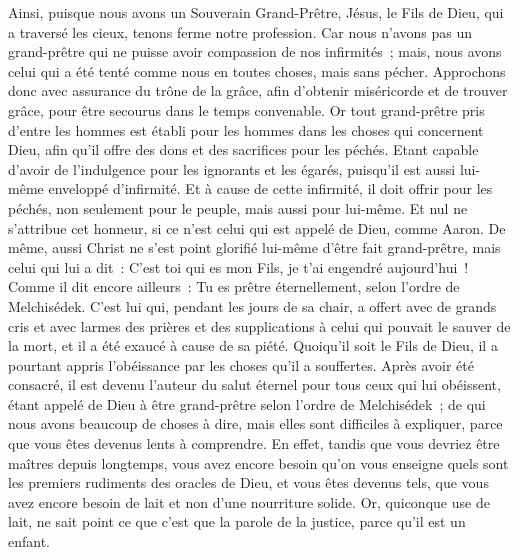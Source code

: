 \begin{multicols}{2}
Ainsi, puisque nous avons un Souverain Grand-Prêtre, Jésus, le Fils de Dieu, qui a traversé les cieux, tenons ferme notre profession.
Car nous n'avons pas un grand-prêtre qui ne puisse avoir compassion de nos infirmités~; mais, nous avons celui qui a été tenté comme nous en toutes choses, mais sans pécher.
Approchons donc avec assurance du trône de la grâce, afin d'obtenir miséricorde et de trouver grâce, pour être secourus dans le temps convenable.
\VerseOne{}Or tout grand-prêtre pris d'entre les hommes est établi pour les hommes dans les choses qui concernent Dieu, afin qu'il offre des dons et des sacrifices pour les péchés.
Etant capable d'avoir de l'indulgence pour les ignorants et les égarés, puisqu'il est aussi lui-même enveloppé d'infirmité.
Et à cause de cette infirmité, il doit offrir pour les péchés, non seulement pour le peuple, mais aussi pour lui-même.
Et nul ne s'attribue cet honneur, si ce n'est celui qui est appelé de Dieu, comme Aaron.
De même, aussi Christ ne s'est point glorifié lui-même d'être fait grand-prêtre, mais celui qui lui a dit~: C'est toi qui es mon Fils, je t'ai engendré aujourd'hui~!
Comme il dit encore ailleurs~: Tu es prêtre éternellement, selon l'ordre de Melchisédek.
C'est lui qui, pendant les jours de sa chair, a offert avec de grands cris et avec larmes des prières et des supplications à celui qui pouvait le sauver de la mort, et il a été exaucé à cause de sa piété.
Quoiqu'il soit le Fils de Dieu, il a pourtant appris l'obéissance par les choses qu'il a souffertes.
Après avoir été consacré, il est devenu l'auteur du salut éternel pour tous ceux qui lui obéissent,
étant appelé de Dieu à être grand-prêtre selon l'ordre de Melchisédek~;
de qui nous avons beaucoup de choses à dire, mais elles sont difficiles à expliquer, parce que vous êtes devenus lents à comprendre.
En effet, tandis que vous devriez être maîtres depuis longtemps, vous avez encore besoin qu'on vous enseigne quels sont les premiers rudiments des oracles de Dieu, et vous êtes devenus tels, que vous avez encore besoin de lait et non d'une nourriture solide.
Or, quiconque use de lait, ne sait point ce que c'est que la parole de la justice, parce qu'il est un enfant.

\end{multicols}
